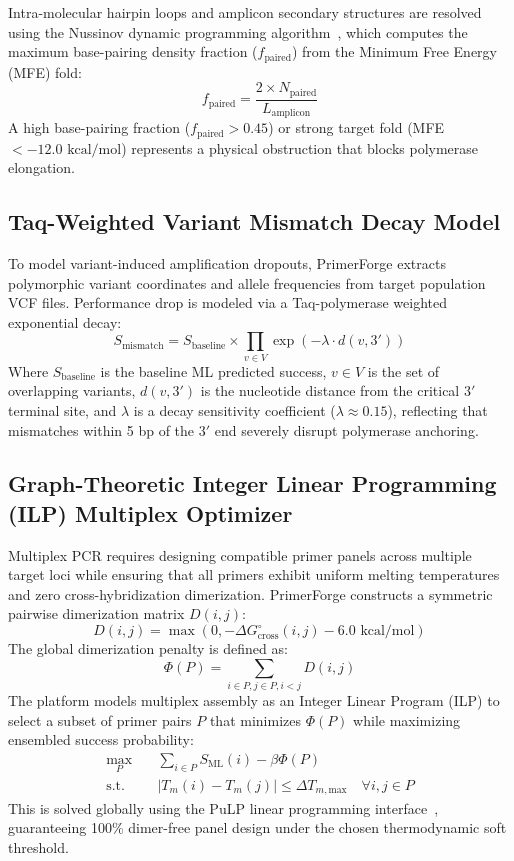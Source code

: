 \documentclass[twocolumn,10pt]{article}
\begin{document}
Intra-molecular hairpin loops and amplicon secondary structures are resolved using the Nussinov dynamic programming algorithm~\cite{nussinov1980}, which computes the maximum base-pairing density fraction ($f_{\text{paired}}$) from the Minimum Free Energy (MFE) fold:
\begin{equation}
f_{\text{paired}} = \frac{2 \times N_{\text{paired}}}{L_{\text{amplicon}}}
\end{equation}
A high base-pairing fraction ($f_{\text{paired}} > 0.45$) or strong target fold (MFE $< -12.0 \text{ kcal/mol}$) represents a physical obstruction that blocks polymerase elongation.

\subsection{Taq-Weighted Variant Mismatch Decay Model}
To model variant-induced amplification dropouts, PrimerForge extracts polymorphic variant coordinates and allele frequencies from target population VCF files. Performance drop is modeled via a Taq-polymerase weighted exponential decay:
\begin{equation}
S_{\text{mismatch}} = S_{\text{baseline}} \times \prod_{v \in V} \exp \left( - \lambda \cdot d(v, 3') \right)
\end{equation}
Where $S_{\text{baseline}}$ is the baseline ML predicted success, $v \in V$ is the set of overlapping variants, $d(v, 3')$ is the nucleotide distance from the critical $3'$ terminal site, and $\lambda$ is a decay sensitivity coefficient ($\lambda \approx 0.15$), reflecting that mismatches within 5 bp of the $3'$ end severely disrupt polymerase anchoring.

\subsection{Graph-Theoretic Integer Linear Programming (ILP) Multiplex Optimizer}
Multiplex PCR requires designing compatible primer panels across multiple target loci while ensuring that all primers exhibit uniform melting temperatures and zero cross-hybridization dimerization. PrimerForge constructs a symmetric pairwise dimerization matrix $D(i, j)$:
\begin{equation}
D(i, j) = \max \left( 0, - \Delta G^\circ_{\text{cross}}(i, j) - 6.0 \text{ kcal/mol} \right)
\end{equation}
The global dimerization penalty is defined as:
\begin{equation}
\Phi(P) = \sum_{i \in P, j \in P, i < j} D(i, j)
\end{equation}
The platform models multiplex assembly as an Integer Linear Program (ILP) to select a subset of primer pairs $P$ that minimizes $\Phi(P)$ while maximizing ensembled success probability:
\begin{align}
\max_{P} \quad & \sum_{i \in P} S_{\text{ML}}(i) - \beta \Phi(P) \\
\text{s.t.} \quad & |T_m(i) - T_m(j)| \le \Delta T_{m,\text{max}} \quad \forall i, j \in P
\end{align}
This is solved globally using the PuLP linear programming interface~\cite{mitchell2011}, guaranteeing 100\% dimer-free panel design under the chosen thermodynamic soft threshold.
\end{document}
